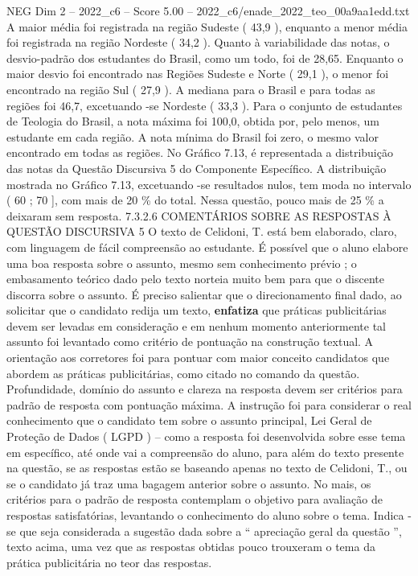 \begin{textsample}{NEG Dim 2 – 2022\_c6 – Score 5.00 – 2022\_c6/enade\_2022\_teo\_00a9aa1edd.txt}
A maior média foi registrada na região Sudeste ( 43,9 ), enquanto a menor média foi registrada na região Nordeste ( 34,2 ).
Quanto à variabilidade das notas, o desvio-padrão dos estudantes do Brasil, como um todo, foi de 28,65.
Enquanto o maior desvio foi encontrado nas Regiões Sudeste e Norte ( 29,1 ), o menor foi encontrado na região Sul ( 27,9 ).
A mediana para o Brasil e para todas as regiões foi 46,7, excetuando -se Nordeste ( 33,3 ).
Para o conjunto de estudantes de Teologia do Brasil, a nota máxima foi 100,0, obtida por, pelo menos, um estudante em cada região.
A nota mínima do Brasil foi zero, o mesmo valor encontrado em todas as regiões.
No Gráfico 7.13, é representada a distribuição das notas da Questão Discursiva 5 do Componente Específico.
A distribuição mostrada no Gráfico 7.13, excetuando -se resultados nulos, tem moda no intervalo ( 60 ; 70 ], com mais de 20 \% do total.
Nessa questão, pouco mais de 25 \% a deixaram sem resposta. 7.3.2.6 COMENTÁRIOS SOBRE AS RESPOSTAS À QUESTÃO DISCURSIVA 5 O texto de Celidoni, T. está bem elaborado, claro, com linguagem de fácil compreensão ao estudante.
É possível que o aluno elabore uma boa resposta sobre o assunto, mesmo sem conhecimento prévio ; o embasamento teórico dado pelo texto norteia muito bem para que o discente discorra sobre o assunto.
É preciso salientar que o direcionamento final dado, ao solicitar que o candidato redija um texto, \textbf{enfatiza} que práticas publicitárias devem ser levadas em consideração e em nenhum momento anteriormente tal assunto foi levantado como critério de pontuação na construção textual.
A orientação aos corretores foi para pontuar com maior conceito candidatos que abordem as práticas publicitárias, como citado no comando da questão.
Profundidade, domínio do assunto e clareza na resposta devem ser critérios para padrão de resposta com pontuação máxima.
A instrução foi para considerar o real conhecimento que o candidato tem sobre o assunto principal, Lei Geral de Proteção de Dados ( LGPD ) – como a resposta foi desenvolvida sobre esse tema em específico, até onde vai a compreensão do aluno, para além do texto presente na questão, se as respostas estão se baseando apenas no texto de Celidoni, T., ou se o candidato já traz uma bagagem anterior sobre o assunto.
No mais, os critérios para o padrão de resposta contemplam o objetivo para avaliação de respostas satisfatórias, levantando o conhecimento do aluno sobre o tema.
Indica -se que seja considerada a sugestão dada sobre a “ apreciação geral da questão ”, texto acima, uma vez que as respostas obtidas pouco trouxeram o tema da prática publicitária no teor das respostas.

\end{textsample}
